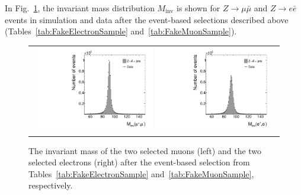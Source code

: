 In Fig.~\ref{fig:Zpeak}, the invariant mass distribution $M_{\text{inv}}$ is shown for $Z\rightarrow \mu \bar{\mu}$ and $Z\rightarrow e \bar{e}$ events in simulation and data after the event-based selections described above (Tables~\ref{tab:FakeElectronSample} and~\ref{tab:FakeMuonSample}).
\begin{figure}[!tb]
  \centering 
  \vspace{20pt}
  \begin{tabular}{c}
    \includegraphics[width=0.49\textwidth]{figures/analysis/Background/hMinvMuons_lin_chiTracksnoSelectionTightMuons.pdf}
    \includegraphics[width=0.49\textwidth]{figures/analysis/Background/hMinvElectrons_lin_chiTracksnoSelectionTightElectrons.pdf}
  \end{tabular}
  \caption{The invariant mass of the two selected muons (left) and the two selected electrons (right) after the event-based selection from Tables~\ref{tab:FakeElectronSample} and~\ref{tab:FakeMuonSample}, respectively.}
  \label{fig:Zpeak}
\end{figure}


